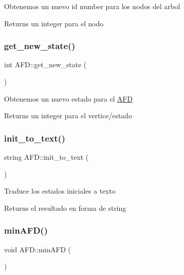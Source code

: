 Obtenemos un nuevo id number para los nodos del arbol \begin{DoxyReturn}{Returns}
un integer para el nodo 
\end{DoxyReturn}
\hypertarget{class_a_f_d_adc0b42986b4299eaaeb0c4384e9c0a2d}{}\label{class_a_f_d_adc0b42986b4299eaaeb0c4384e9c0a2d} 
\subsubsection{\texorpdfstring{get\+\_\+new\+\_\+state()}{get\_new\_state()}}
{\footnotesize\ttfamily int A\+F\+D\+::get\+\_\+new\+\_\+state (\begin{DoxyParamCaption}{ }\end{DoxyParamCaption})}

Obtenemos un nuevo estado para el \hyperlink{class_a_f_d}{A\+FD} \begin{DoxyReturn}{Returns}
un integer para el vertice/estado 
\end{DoxyReturn}
\hypertarget{class_a_f_d_ae2bf9a8a6511e585c911ff1c2416bb3e}{}\label{class_a_f_d_ae2bf9a8a6511e585c911ff1c2416bb3e} 
\subsubsection{\texorpdfstring{init\+\_\+to\+\_\+text()}{init\_to\_text()}}
{\footnotesize\ttfamily string A\+F\+D\+::init\+\_\+to\+\_\+text (\begin{DoxyParamCaption}{ }\end{DoxyParamCaption})}

Traduce los estados iniciales a texto \begin{DoxyReturn}{Returns}
el resultado en forma de string 
\end{DoxyReturn}
\hypertarget{class_a_f_d_a1c7d05c678a6cc4e31c2b4cb93b6408e}{}\label{class_a_f_d_a1c7d05c678a6cc4e31c2b4cb93b6408e} 
\subsubsection{\texorpdfstring{min\+A\+F\+D()}{minAFD()}}
{\footnotesize\ttfamily void A\+F\+D\+::min\+A\+FD (\begin{DoxyParamCaption}{ }\end{DoxyParamCaption})}

